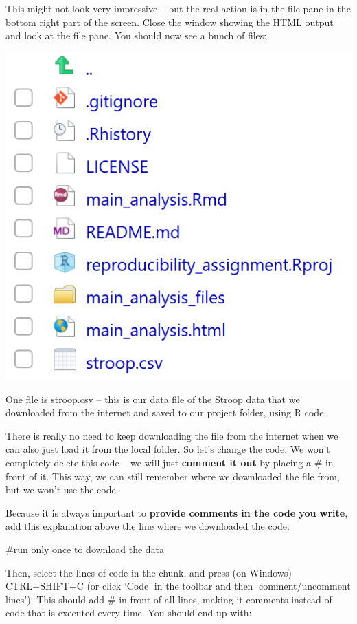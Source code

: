 \documentclass[
  oneside]{krantz}
\begin{document}
This might not look very impressive -- but the real action is in the file pane in
the bottom right part of the screen. Close the window showing the HTML output
and look at the file pane. You should now see a bunch of files:

\begin{center}\includegraphics[width=1\linewidth]{images/0ba38e2b99fd3e1a10f943d1ab45f156} \end{center}

One file is stroop.csv -- this is our data file of the Stroop data that we
downloaded from the internet and saved to our project folder, using R code.

There is really no need to keep downloading the file from the internet when we
can also just load it from the local folder. So let's change the code. We won't
completely delete this code -- we will just \textbf{comment it out} by placing a \# in
front of it. This way, we can still remember where we downloaded the file from,
but we won't use the code.

Because it is always important to \textbf{provide comments in the code you write},
add this explanation above the line where we downloaded the code:

\#run only once to download the data

Then, select the lines of code in
the chunk, and press (on Windows) CTRL+SHIFT+C (or click `Code' in the toolbar
and then `comment/uncomment lines'). This should add \# in front of all lines,
making it comments instead of code that is executed every time. You should end
up with:
\end{document}
